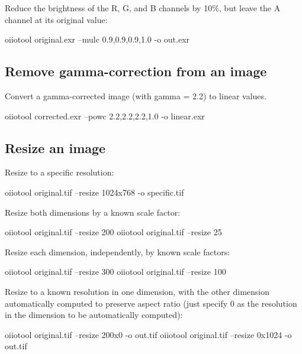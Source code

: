 Reduce the brightness of the R, G, and B channels by 10\%,
but leave the A channel at its original value:

\begin{code}
    oiiotool original.exr --mulc 0.9,0.9,0.9,1.0 -o out.exr
\end{code}

\subsection*{Remove gamma-correction from an image}

Convert a gamma-corrected image (with gamma = 2.2) to linear values.

\begin{code}
    oiiotool corrected.exr --powc 2.2,2.2,2.2,1.0 -o linear.exr
\end{code}

\subsection*{Resize an image}

\noindent Resize to a specific resolution:

\begin{code}
    oiiotool original.tif --resize 1024x768 -o specific.tif
\end{code}

\noindent Resize both dimensions by a known scale factor:

\begin{code}
    oiiotool original.tif --resize 200%
    oiiotool original.tif --resize 25%
\end{code}

\noindent Resize each dimension, independently, by known scale factors:

\begin{code}
    oiiotool original.tif --resize 300%
    oiiotool original.tif --resize 100%
\end{code}

\noindent Resize to a known resolution in one dimension, with the other dimension
automatically computed to preserve aspect ratio (just specify 0 as the
resolution in the dimension to be automatically computed):

\begin{code}
    oiiotool original.tif --resize 200x0 -o out.tif
    oiiotool original.tif --resize 0x1024 -o out.tif
\end{code}


